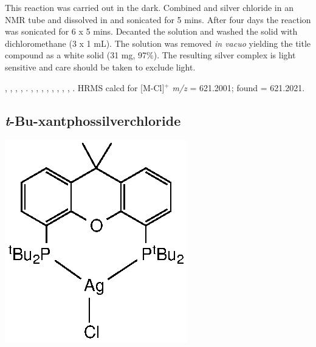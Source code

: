 This reaction was carried out in the dark.  Combined  and silver chloride in an NMR tube and dissolved in  and sonicated for 5 mins.  After four days the reaction was sonicated for 6 x 5 mins.  Decanted the solution and washed the solid with dichloromethane (3 x 1 mL).  The solution was removed \emph{in vacuo} yielding the title compound as a white solid (31 mg, 97\%).  The resulting silver complex is light sensitive and care should be taken to exclude light.

,
,
,
,
.
,
,
,
,
,
, 
, 
,
.
HRMS calcd for  [M-Cl]$^+$ \emph{m/z} = 621.2001; found = 621.2021.




\subsection*{\emph{t}-Bu-xantphossilverchloride} 

\begin{structure}[h]
\begin{center}
\includegraphics{../Structures/CtBuSilverChloride.eps}
\end{center}
\end{structure}

